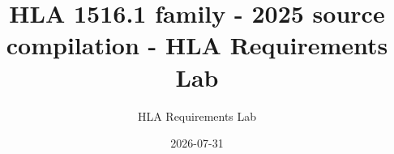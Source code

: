 \documentclass[10pt,oneside]{article}
\title{HLA 1516.1 family - 2025 source compilation - HLA Requirements Lab}
\author{HLA Requirements Lab}
\date{2026-07-31}
\begin{document}
    \def\HLASkipSemanticContentElementData{}
    
    
    \raggedbottom
    
\end{document}
